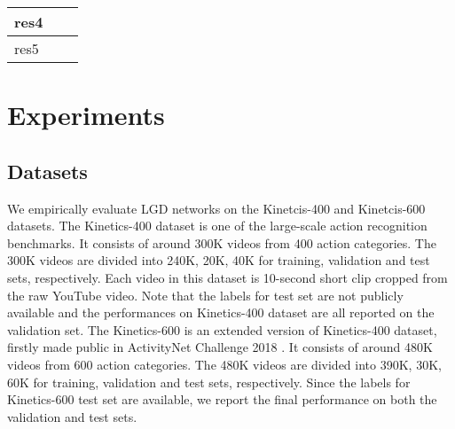 \documentclass[10pt,twocolumn,letterpaper]{article}
\begin{document}
\begin{table}
\begin{tabular}{l|c|c}
\begin{minipage}{0.88cm}\vspace{0.55cm} res4 \vspace{0.55cm}\end{minipage}    &  &  \\ \hline
\begin{minipage}{0.88cm}\vspace{0.55cm} res5 \vspace{0.55cm}\end{minipage}    &  &  \\ \hline
\end{tabular}
\vspace{-0.15in}
\label{tab:arch}
\end{table}

\section{Experiments}
\subsection{Datasets}
We empirically evaluate LGD networks on the Kinetcis-400 \cite{carreira2017quo} and Kinetcis-600 \cite{ghanem2018activitynet} datasets. The Kinetics-400 dataset is one of the large-scale action recognition benchmarks. It consists of around 300K videos from 400 action categories. The 300K videos are divided into 240K, 20K, 40K for training, validation and test sets, respectively. Each video in this dataset is 10-second short clip cropped from the raw YouTube video. Note that the labels for test set are not publicly available and the performances on Kinetics-400 dataset are all reported on the validation set. The Kinetics-600 is an extended version of Kinetics-400 dataset, firstly made public in ActivityNet Challenge 2018 \cite{ghanem2018activitynet}. It consists of around 480K videos from 600 action categories. The 480K videos are divided into 390K, 30K, 60K for training, validation and test sets, respectively. Since the labels for Kinetics-600 test set are available, we report the final performance on both the validation and test sets.
\end{document}
